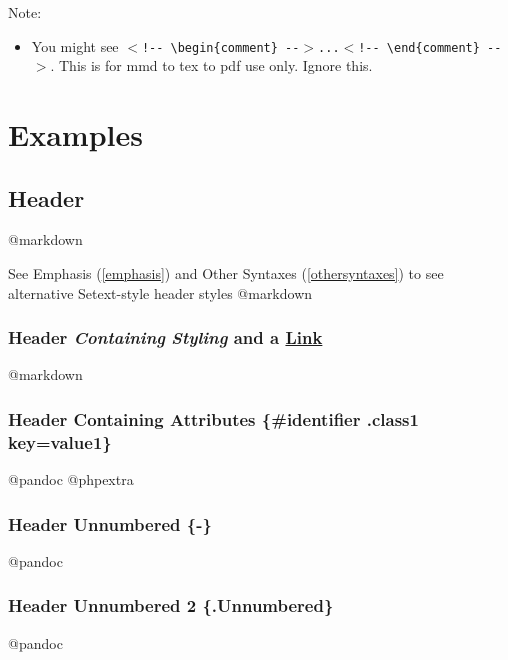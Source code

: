 Note:

\begin{itemize}
\item You might see \texttt{$<$!-{}- \textbackslash{}begin\{comment\} -{}-$>$...$<$!-{}- \textbackslash{}end\{comment\} -{}-$>$}. This is for mmd to tex to pdf use only. Ignore this.

\end{itemize}

\chapter{Examples}
\label{examples}

\section{Header}
\label{header}

@markdown

See Emphasis (\autoref{emphasis}) and Other Syntaxes (\autoref{othersyntaxes}) to see alternative Setext-style header styles @markdown

\subsection{Header \emph{Containing} \textbf{\emph{Styling}} and a \href{Https://www.wikipedia.org/}{Link}}
\label{headercontainingstylingandalink}

@markdown

\subsection{Header Containing Attributes \{\#identifier .class1 key=value1\}}
\label{headercontainingattributesidentifier.class1keyvalue1}

@pandoc @phpextra

\subsection{Header Unnumbered \{-\}}
\label{headerunnumbered-}

@pandoc

\subsection{Header Unnumbered 2 \{.Unnumbered\}}
\label{headerunnumbered2.unnumbered}

@pandoc


